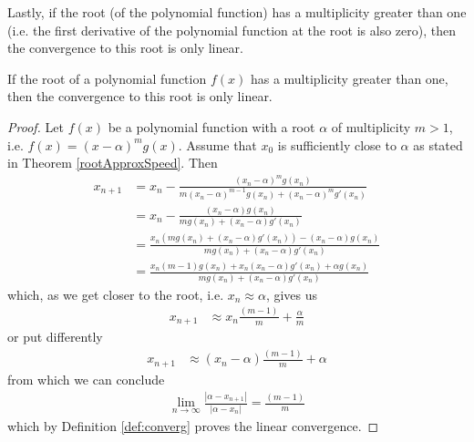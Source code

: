\documentclass[
  digital, %
  notable,   %
  nolof,     %
  nolot,     %
	final, %
]{fithesis3}
\begin{document}
Lastly, if the root (of the polynomial function) has a multiplicity greater than one (i.e. the first derivative of the polynomial function at the root is also zero), then the convergence to this root is only linear.
\begin{theorem}
If the root of a polynomial function $f(x)$ has a multiplicity greater than one, then the convergence to this root is only linear.
\end{theorem}
\begin{proof}
Let $f(x)$ be a polynomial function with a root $\alpha$ of multiplicity $m > 1$, i.e. $f(x) = (x-\alpha)^{m}g(x)$. Assume that $x_{0}$ is sufficiently close to $\alpha$ as stated in Theorem \ref{rootApproxSpeed}. Then
\begin{align}
x_{n+1} &= x_{n} - \frac{(x_{n} - \alpha)^{m}g(x_{n})}{m(x_{n}-\alpha)^{m-1}g(x_{n}) + (x_{n}-\alpha)^{m}g'(x_{n})} \\
&= x_{n} - \frac{(x_{n} - \alpha)g(x_{n})}{mg(x_{n}) + (x_{n}-\alpha)g'(x_{n})} \\
&= \frac{x_{n}(mg(x_{n}) + (x_{n}-\alpha)g'(x_{n})) - (x_{n} - \alpha)g(x_{n})}{mg(x_{n}) + (x_{n}-\alpha)g'(x_{n})} \\
&= \frac{x_{n}(m - 1)g(x_{n}) + x_{n}(x_{n}-\alpha)g'(x_{n}) + {\alpha}g(x_{n})}{mg(x_{n}) + (x_{n}-\alpha)g'(x_{n})}
\end{align}
which, as we get closer to the root, i.e. $x_{n} \approx \alpha$, gives us
\begin{align}
x_{n+1} &\approx x_{n}\frac{(m - 1)}{m}+\frac{\alpha}{m}
\end{align}
or put differently
\begin{align}
x_{n+1} &\approx (x_{n}-\alpha)\frac{(m - 1)}{m}+\alpha
\end{align}
from which we can conclude
\begin{align}
\lim_{n\to\infty}\frac{\left|\alpha - x_{n+1}\right|}{\left|\alpha-x_{n}\right|} = \frac{(m - 1)}{m}
\end{align}
which by Definition \ref{def:converg} proves the linear convergence.
\end{proof}
\end{document}

